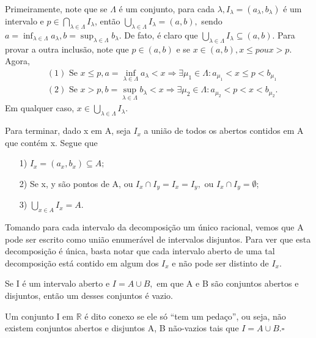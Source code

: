 \documentclass[analysis_notes.tex]{subfiles}
\begin{document}
\begin{proof*}
	Primeiramente, note que se $\Lambda $ \'e um conjunto, para cada $\lambda, I_{\lambda }=(a_{\lambda }, b_{\lambda })$ \'e um intervalo
	e $p\in\bigcap_{\lambda \in\Lambda }^{}{I_{\lambda }}$, ent\~ao $\bigcup_{\lambda \in\Lambda }^{}{I_{\lambda }}=(a, b),$ sendo
	$a = \inf_{\lambda \in\Lambda }a_{\lambda }, b = \sup_{\lambda \in\Lambda }b_{\lambda }.$ De fato, \'e claro que $\bigcup_{\lambda \in\Lambda }^{}{I_{\lambda }}\subseteq{(a, b)}$.
	Para provar a outra inclus\~ao, note que $p\in(a, b)$ e se $x\in(a, b), x\leq p ou x > p.$ Agora,
	\begin{align*}
		 & (1) \text{ Se }  x\leq p, a = \inf_{\lambda \in\Lambda }a_{\lambda } < x \Rightarrow \exists \mu_{1}\in\Lambda: a_{\mu_{1}}<x\leq p < b_{\mu_{1}} \\
		 & (2) \text{ Se } x > p, b=\sup_{\lambda \in\Lambda }b_{\lambda } < x \Rightarrow \exists \mu_{2}\in\Lambda: a_{\mu_{2}} < p < x < b_{\mu_{2}}.
	\end{align*}
	Em qualquer caso,  $x\in \bigcup_{\lambda \in\Lambda }^{}{I_{\lambda }}.$

	Para terminar, dado x em A, seja $I_{x}$ a uni\~ao de todos os abertos contidos em A que cont\'em x. Segue que
	\begin{itemize}
		\item[1)] $I_{x} = (a_{x}, b_{x})\subseteq{A};$
		\item[2)] Se x, y s\~ao pontos de A, ou $I_{x}\cap I_{y}=I_{x} = I_{y},$ ou $I_{x}\cap I_{y} = \emptyset$;
		\item[3)] $\bigcup_{x\in A}^{}{I_{x}} = A.$
	\end{itemize}
	Tomando para cada intervalo da decomposi\c c\~ao um \'unico racional, vemos que A pode ser escrito como uni\~ao enumer\'avel de
	intervalos disjuntos. Para ver que esta decomposi\c c\~ao \'e \'unica, basta notar que cada intervalo aberto de uma tal decomposi\c c\~ao
	est\'a contido em algum dos $I_{x}$ e n\~ao pode ser distinto de $I_{x}.$ \qedsymbol
\end{proof*}
\begin{crl*}
	Se I \'e um intervalo aberto e $I = A\cup B,$ em que A e B s\~ao conjuntos abertos e disjuntos, ent\~ao um desses conjuntos \'e vazio.
\end{crl*}
\begin{def*}
	Um conjunto I em $\mathbb{R}$ \'e dito conexo se ele s\'o ``tem um peda\c co'', ou seja, n\~ao existem conjuntos abertos e disjuntos A, B
	n\~ao-vazios tais que $I = A\cup{B}.\square$
\end{def*}
\end{document}
